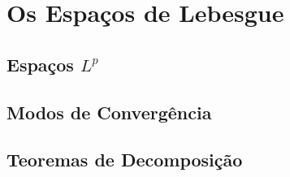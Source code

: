 \chapter{Os Espaços de Lebesgue}












\section{Espaços \texorpdfstring{$L^p$}{Lp}}













\section{Modos de Convergência}










\section{Teoremas de Decomposição}